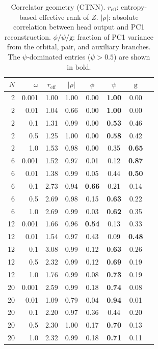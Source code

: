 \begin{table}[t]
\centering
\caption[Correlator feature geometry]{Correlator geometry (CTNN).
$r_{\mathrm{eff}}$: entropy-based effective rank of $Z$.
$|\rho|$: absolute correlation between head output and PC1 reconstruction.
$\phi/\psi/\mathrm{g}$: fraction of PC1 variance from the orbital, pair, and auxiliary branches.
The $\psi$-dominated entries ($\psi > 0.5$) are shown in bold.}
\label{tab:correlator-geom}
\small
\setlength{\tabcolsep}{4pt}
\begin{tabular}{rr cccccc}
\toprule
$N$ & $\omega$ & $r_{\mathrm{eff}}$ & $|\rho|$ & $\phi$ & $\psi$ & $\mathrm{g}$ \\
\midrule
 2 & 0.001 & 1.00 & 1.00 & 0.00 & \textbf{1.00} & 0.00 \\
 2 & 0.01  & 1.04 & 0.66 & 0.00 & \textbf{1.00} & 0.00 \\
 2 & 0.1   & 1.31 & 0.99 & 0.00 & \textbf{0.53} & 0.46 \\
 2 & 0.5   & 1.25 & 1.00 & 0.00 & \textbf{0.58} & 0.42 \\
 2 & 1.0   & 1.53 & 0.98 & 0.00 & 0.35 & \textbf{0.65} \\
\midrule
 6 & 0.001 & 1.52 & 0.97 & 0.01 & 0.12 & \textbf{0.87} \\
 6 & 0.01  & 1.38 & 0.99 & 0.05 & 0.44 & \textbf{0.50} \\
 6 & 0.1   & 2.73 & 0.94 & \textbf{0.66} & 0.21 & 0.14 \\
 6 & 0.5   & 2.69 & 0.98 & 0.15 & \textbf{0.63} & 0.22 \\
 6 & 1.0   & 2.69 & 0.99 & 0.03 & \textbf{0.62} & 0.35 \\
\midrule
12 & 0.001 & 1.66 & 0.96 & \textbf{0.54} & 0.13 & 0.33 \\
12 & 0.01  & 1.54 & 0.97 & 0.43 & 0.09 & \textbf{0.48} \\
12 & 0.1   & 3.08 & 0.99 & 0.12 & \textbf{0.63} & 0.26 \\
12 & 0.5   & 2.32 & 0.99 & 0.12 & \textbf{0.69} & 0.19 \\
12 & 1.0   & 1.76 & 0.99 & 0.08 & \textbf{0.73} & 0.19 \\
\midrule
20 & 0.001 & 2.59 & 0.99 & 0.18 & \textbf{0.74} & 0.08 \\
20 & 0.01  & 1.09 & 0.79 & 0.04 & \textbf{0.94} & 0.01 \\
20 & 0.1   & 2.20 & 0.97 & 0.36 & 0.44 & 0.20 \\
20 & 0.5   & 2.30 & 1.00 & 0.17 & \textbf{0.70} & 0.13 \\
20 & 1.0   & 2.32 & 0.99 & 0.18 & \textbf{0.71} & 0.11 \\
\bottomrule
\end{tabular}
\end{table}

